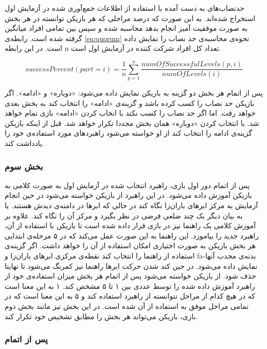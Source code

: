 \documentclass[twoside, a4paper,11pt]{book}
\numberwithin{equation}{chapter}
\numberwithin{table}{chapter}
\numberwithin{figure}{chapter}
\numberwithin{equation}{chapter}
\newcommand{\mls}[1]{\gls{fa-#1}\glsuseri{la-#1}}
\begin{document}
حدنصاب‌های به دست آمده با استفاده از اطلاعات جمع‌آوری شده در آزمایش اول استخراج شده‌اند. به این صورت که درصد مراحلی که هر بازیکن توانسته در هر بخش به صورت موفقیت آمیز انجام بدهد محاسبه شده و سپس بین تمامی افراد میانگین گرفته شده است. رابطه‌ی \ref{eq:quorum} نحوه‌ی محاسبه‌ی حد نصاب را نمایش داده است. در این رابطه n تعداد کل افراد شرکت کننده در آزمایش اول است.

\begin{equation}
\label{eq:quorum}
	successPercent(part = i) = \frac{1}{n} \sum_{p = 1}^{n} \frac{numOfSuccessfulLevels(p, i)}{numOfLevels(i)}
\end{equation}

پس از اتمام هر بخش دو گزینه به بازیکن نمایش داده می‌شود: «دوباره» و «ادامه». اگر بازیکن حد نصاب را کسب کرده باشد و گزینه‌ی «ادامه» را انتخاب کند به بخش بعدی خواهد رفت. اما اگر حد نصاب را کسب نکند با انخاب کردن «ادامه» بازی تمام خواهد شد. با انتخاب کردن «دوباره» همان بخش مجددا تکرار خواهد شد. قبل از اینکه بازیکن گزینه‌ی ادامه را انتخاب کند از او خواسته می‌شود راهبردهای مورد استفاده‌ی خود را یادداشت کند.

\subsubsection{بخش سوم} \label{partTwoMainTest:three}

پس از اتمام دور اول بازی، راهبرد انتخاب شده در آزمایش اول به صورت کلامی به بازیکن آموزش داده می‌شود. در این راهبرد از بازیکن خواسته می‌شود در حین انجام آزمایش به مرکز ابرهای باران‌زا نگاه کند در حالی که ابرها در دامنه‌ی دیدش هستند. یا به بیان دیگر یک چند ضلعی فرضی در نظر بگیرد و مرکز آن را نگاه کند. علاوه بر آموزش کلامی یک راهنما نیز در بازی قرار داده شده است تا بازیکن با استفاده از آن، راهبرد جدید را بیاموزد. این راهنما به این صورت عمل می‌کند که در ۵ مرحله‌ی ابتدایی هر بخش بازیکن به صورت اختیاری امکان استفاده از آن را خواهد داشت. اگر گزینه‌ی استفاده از راهنما را انتخاب کند نقطه‌ی مرکزی ابرهای باران‌زا و \mls{بدنه‌ی محدب} آنها نمایش داده می‌شود. در حین کند شدن حرکت ابرها راهنما نیز کمرنگ می‌شود تا نهایتا حذف شود. از بازیکن خواسته می‌شود پس از اتمام هر بخش میزان استفاده‌ی خود از راهبرد آموزش داده شده را توسط عددی بین ۱ تا ۵ مشخص کند. ۱ به این معنا است که در هیچ کدام از مراحل نتوانسته از راهبرد استفاده کند و ۵ به این معنا است که در تمامی مراحل موفق به استفاده از آن شده است. در این بخش نیز مانند بخش دوم بازی، بازیکن می‌تواند هر بخش را مطابق تشخیص خود تکرار کند.

\subsubsection{پس از اتمام}
\end{document}
